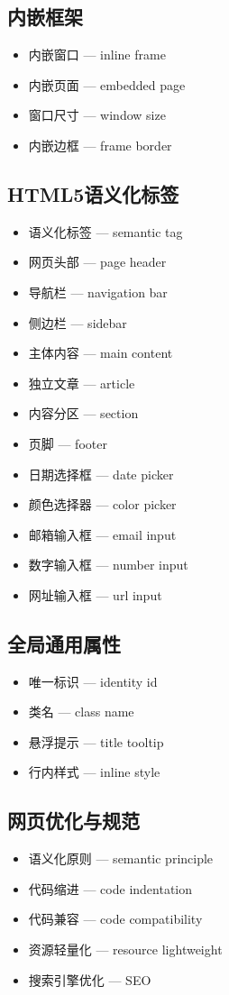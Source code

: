 \subsection{内嵌框架}
\begin{itemize}
\item 内嵌窗口 — inline frame
\item 内嵌页面 — embedded page
\item 窗口尺寸 — window size
\item 内嵌边框 — frame border
\end{itemize}

\subsection{HTML5语义化标签}
\begin{itemize}
\item 语义化标签 — semantic tag
\item 网页头部 — page header
\item 导航栏 — navigation bar
\item 侧边栏 — sidebar
\item 主体内容 — main content
\item 独立文章 — article
\item 内容分区 — section
\item 页脚 — footer
\item 日期选择框 — date picker
\item 颜色选择器 — color picker
\item 邮箱输入框 — email input
\item 数字输入框 — number input
\item 网址输入框 — url input
\end{itemize}

\subsection{全局通用属性}
\begin{itemize}
\item 唯一标识 — identity id
\item 类名 — class name
\item 悬浮提示 — title tooltip
\item 行内样式 — inline style
\end{itemize}

\subsection{网页优化与规范}
\begin{itemize}
\item 语义化原则 — semantic principle
\item 代码缩进 — code indentation
\item 代码兼容 — code compatibility
\item 资源轻量化 — resource lightweight
\item 搜索引擎优化 — SEO
\end{itemize}
